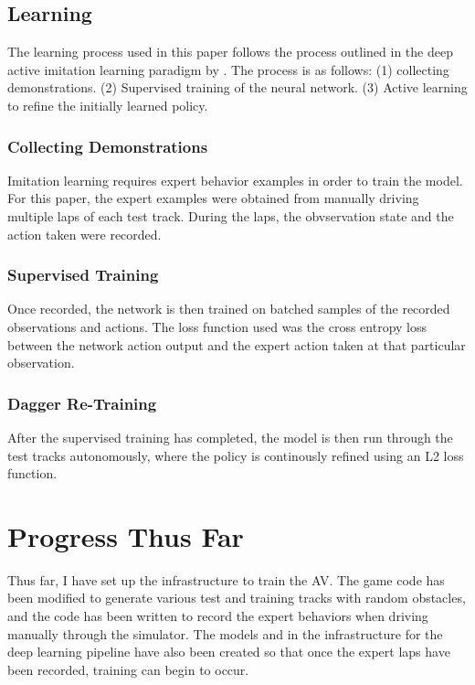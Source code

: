 \documentclass[conference]{IEEEtran}
\begin{document}
\subsection{Learning}
The learning process used in this paper follows the process outlined in the deep active imitation
learning paradigm by \citet{deepImitation}. The process is as follows: (1) collecting demonstrations. 
(2) Supervised training of the neural network. (3) Active learning to refine the initially learned policy.
\subsubsection{Collecting Demonstrations}
Imitation learning requires expert behavior examples in order to train the model. For this paper, 
the expert examples were obtained from manually driving multiple laps of each test track. During 
the laps, the obvservation state and the action taken were recorded.
\subsubsection{Supervised Training}
Once recorded, the network is then trained on batched samples of the recorded observations and actions.
The loss function used was the cross entropy loss between the network action output and the 
expert action taken at that particular observation. 
\subsubsection{Dagger Re-Training}
After the supervised training has completed, the model is then run through the test tracks autonomously,
where the policy is continously refined using an L2 loss function. 

\section{Progress Thus Far} 
\label{sec:conclusion}

Thus far, I have set up the infrastructure to train the AV. The game code has been modified to 
generate various test and training tracks with random obstacles, and the code has been written to 
record the expert behaviors when driving manually through the simulator. The models and in the infrastructure
for the deep learning pipeline have also been created so that once the expert laps have been recorded,
training can begin to occur. 




\end{document}
